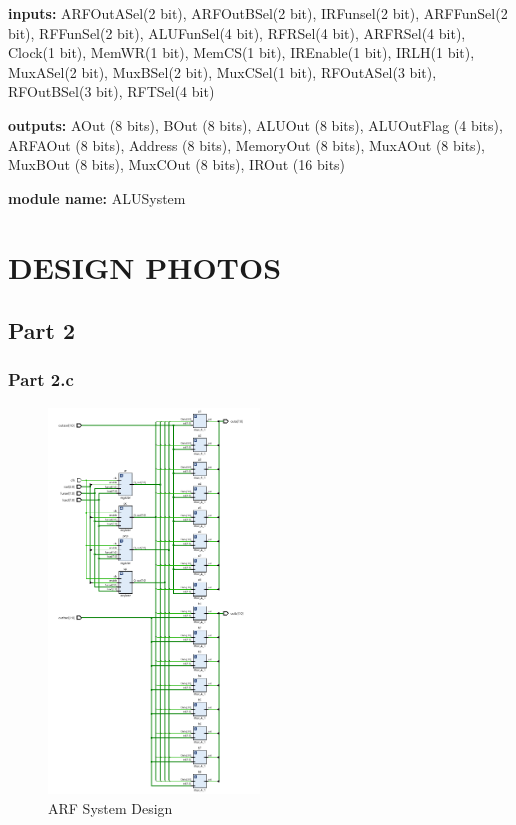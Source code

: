 \documentclass[pdftex,12pt,a4paper]{article}
\begin{document}
	


	\textbf{inputs:}
	ARFOutASel(2 bit), ARFOutBSel(2 bit), IRFunsel(2 bit), ARFFunSel(2 bit),
	RFFunSel(2 bit), ALUFunSel(4 bit), RFRSel(4 bit), ARFRSel(4 bit),
	Clock(1 bit), MemWR(1 bit), MemCS(1 bit), IREnable(1 bit),
	IRLH(1 bit), MuxASel(2 bit), MuxBSel(2 bit), MuxCSel(1 bit),
	RFOutASel(3 bit), RFOutBSel(3 bit), RFTSel(4 bit)


	\textbf{outputs:} 
	AOut (8 bits),
    BOut (8 bits),
    ALUOut (8 bits),
    ALUOutFlag (4 bits),
    ARFAOut (8 bits),
    Address (8 bits),
    MemoryOut (8 bits), 
    MuxAOut (8 bits), 
    MuxBOut (8 bits),
    MuxCOut (8 bits),
    IROut (16 bits)

	\textbf{module name:} ALUSystem







\section{DESIGN PHOTOS}
\subsection{Part 2}
\subsubsection{Part 2.c}
\begin{figure}[H]
	\centering
	\includegraphics[width=0.5\textwidth]{design/arf.png}	
	\caption{ARF System Design}
	\label{ARF System Design}
\end{figure}
\end{document}

